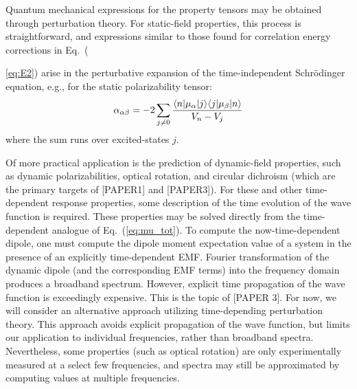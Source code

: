 Quantum mechanical expressions for the property tensors may be obtained through perturbation theory. 
For static-field properties, this process is straightforward, and expressions similar to those found for
correlation energy corrections in Eq.~({\ref{eq:E2}) arise in the perturbative expansion of the time-independent Schr\"odinger
equation, e.g., for the static polarizability tensor:
\begin{equation} \label{eq:static_pol}
\alpha_{\alpha\beta} = -2\sum_{j\neq 0}\frac{\langle n |\mu_\alpha| j \rangle\langle j |\mu_\beta| n \rangle}{V_n - V_j} 
\end{equation}
where the sum runs over excited-states $j$.

Of more practical application is the prediction of dynamic-field properties, such as dynamic polarizabilities, 
optical rotation, and circular dichroism (which are the primary targets of [PAPER1] and [PAPER3]).
For these and other time-dependent response properties, some description of the time evolution of the wave function is
required. 
These properties may be solved directly from the time-dependent analogue of Eq.~(\ref{eq:mu_tot}). 
To compute the now-time-dependent dipole, one must compute the dipole moment expectation value of a system 
in the presence of an explicitly time-dependent EMF.
Fourier transformation of the dynamic dipole (and the corresponding EMF terms) 
into the frequency domain produces a broadband spectrum.
However, explicit time propagation of the wave function is exceedingly expensive.\cite{Goings2018} 
This is the topic of [PAPER 3]. 
For now, we will consider an alternative approach utilizing time-depending perturbation 
theory. This approach avoids explicit propagation of the wave function, but limits our
application to individual frequencies, rather than broadband spectra. Nevertheless, 
some properties (such as optical rotation) are only experimentally measured at a select few
frequencies, and spectra may still be approximated by computing values at 
multiple frequencies. 

}
